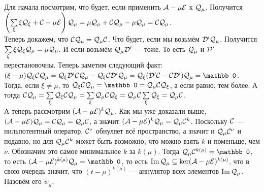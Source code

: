 \documentclass{article}
\DeclareMathOperator{\operIm}{Im}
\let\Im\operIm
\newcommand*{\id}{{\scriptE}}
\begin{document}
\begin{itemize}
\begin{Proof}
\begin{enumerate}
\begin{itemize}
                \end{itemize}
            \end{enumerate}
            Для начала посмотрим, что будет, если применить $\scriptA-\mu\id$ к ${\mathcal{Q}}_\mu$. Получится $\left(\sum\limits_\xi\xi\scriptQ_\xi+\scriptC-\mu\id\right)\scriptQ_\mu=\mu\scriptQ_\mu+\scriptC\scriptQ_\mu-\mu\scriptQ_\mu=\scriptC\scriptQ_\mu$.\\
            Теперь докажем, что ${\mathcal{C}}{\mathcal{Q}}_\mu={\mathcal{Q}}_\mu{\mathcal{C}}$. Что будет, если мы возьмём ${\mathcal{D}}'{\mathcal{Q}}_\mu$. Получится $\sum\limits_\xi\xi{\mathcal{Q}}_\xi{\mathcal{Q}}_\mu=\mu{\mathcal{Q}}_\mu$. И если возьмём ${\mathcal{Q}}_\mu{\mathcal{D}}'$ --- тоже. То есть ${\mathcal{Q}}_\mu$ и ${\mathcal{D}}'$ перестановочны. Теперь заметим следующий факт: $(\xi-\mu)\scriptQ_\xi\scriptC\scriptQ_\mu=\scriptQ_\xi\scriptD'\scriptC\scriptQ_\mu-\scriptQ_\xi\scriptC\scriptD'\scriptQ_\mu=\scriptQ_\xi(\scriptD'\scriptC-\scriptC\scriptD')\scriptQ_\mu=\mathbb0$. Тогда, если $\xi\neq\mu$, то $\scriptQ_\xi\scriptC\scriptQ_\mu=\mathbb0=\scriptQ_\mu\scriptC\scriptQ_\xi$, а если равно, тем более. А тогда ${\mathcal{C}}{\mathcal{Q}}_\mu=\sum\limits_{\xi}{\mathcal{Q}}_\xi{\mathcal{C}}{\mathcal{Q}}_\mu=\sum\limits_{\xi}{\mathcal{Q}}_\mu{\mathcal{C}}{\mathcal{Q}}_\xi={\mathcal{Q}}_\mu{\mathcal{C}}\sum\limits_{\xi}{\mathcal{Q}}_\xi={\mathcal{Q}}_\mu{\mathcal{C}}$.\\
            А теперь рассмотрим $(\scriptA-\mu\id)^k\scriptQ_\mu$. Как мы уже доказали выше, $(\scriptA-\mu\id)\scriptQ_\mu=\scriptC\scriptQ_\mu=\scriptQ_\mu\scriptC$, а значит $(\scriptA-\mu\id)^k\scriptQ_\mu=\scriptQ_\mu\scriptC^k$. Поскольку ${\mathcal{C}}$ --- нильпотентный оператор, ${\mathcal{C}}^\nu$ обнуляет всё пространство, а значит и ${\mathcal{Q}}_\mu{\mathcal{C}}^\nu$ и подавно, но для ${\mathcal{Q}}_\mu{\mathcal{C}}^k$ может быть возможно, что можно взять $k$ и поменьше, чем $\nu$. Обозначим это самое минимальное $k$ за $k(\mu)$. Тогда $\scriptQ_\mu\scriptC^{k(\mu)}=\mathbb0$, то есть $(\scriptA-\mu\id)^{k(\mu)}\scriptQ_\mu=\mathbb0$, то есть $\Im\scriptQ_\mu\subseteq\ker(\scriptA-\mu\id)^{k(\mu)}$, что в свою очередь значит, что $(t-\mu)^{k(\mu)}$ --- аннулятор всех элементов $\Im\scriptQ_\mu$. Назовём его $\psi_\mu$.\\

\end{Proof}
\end{itemize}
\end{document}
